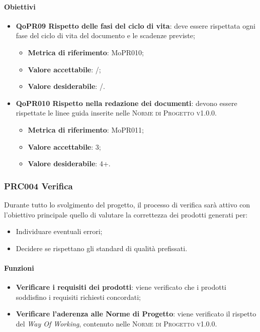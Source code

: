 \documentclass[../piano-di-qualifica.tex]{subfiles}
\begin{document}
\paragraph{Obiettivi}
\label{sub:obiettivi_3}
\begin{itemize}
    \item \textbf{QoPR09 Rispetto delle fasi del ciclo di vita}: deve essere rispettata ogni fase del ciclo di vita del documento e le scadenze previste;
        \begin{itemize}
            \item \textbf{Metrica di riferimento}: MoPR010;
            \item \textbf{Valore accettabile}: /; %
            \item \textbf{Valore desiderabile}: /.
        \end{itemize}
    \item \textbf{QoPR010 Rispetto nella redazione dei documenti}: devono essere rispettate le linee guida inserite nelle \textsc{Norme di Progetto v1.0.0}.
        \begin{itemize}
            \item \textbf{Metrica di riferimento}: MoPR011;
            \item \textbf{Valore accettabile}: 3; %
            \item \textbf{Valore desiderabile}: 4+.
        \end{itemize}
\end{itemize}

\subsubsection{PRC004 Verifica}
\label{sub:produzione_dei_documenti}
Durante tutto lo svolgimento del progetto, il processo di verifica sarà attivo con l'obiettivo principale quello di valutare la correttezza dei prodotti generati per: 
\begin{itemize}
    \item Individuare eventuali errori;
    \item Decidere se rispettano gli standard di qualità prefissati.
\end{itemize}

\paragraph{Funzioni}
\label{sub:funzioni_4}
\begin{itemize}
    \item \textbf{Verificare i requisiti dei prodotti}: viene verificato che i prodotti soddisfino i requisiti richiesti concordati;
    \item \textbf{Verificare l'aderenza alle Norme di Progetto}: viene verificato il rispetto del \textit{Way Of Working}, contenuto nelle \textsc{Norme di Progetto v1.0.0}.
\end{itemize}
\end{document}
